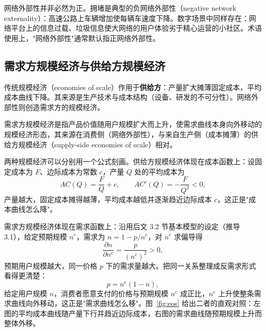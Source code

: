网络外部性并非必然为正。拥堵是典型的负网络外部性（negative network externality）：高速公路上车辆增加使每辆车速度下降。数字场景中同样存在：网络平台上的信息过载、垃圾信息使大网络的用户体验劣于精心运营的小社区。术语使用上，"网络外部性"通常默认指正网络外部性。

\subsection{需求方规模经济与供给方规模经济}

传统规模经济（economies of scale）作用于\textbf{供给方}：产量扩大摊薄固定成本，平均成本曲线下降。其来源是生产技术与成本结构（设备、研发的不可分性）。网络外部性则创造需求方的规模经济。

\begin{definition}
需求方规模经济是指产品价值随用户规模扩大而上升，使需求曲线本身向外移动的规模经济形态，其来源在消费侧（网络外部性），与来自生产侧（成本摊薄）的供给方规模经济（supply-side economies of scale）相对。
\end{definition}

两种规模经济可以分别用一个公式刻画。供给方规模经济体现在成本函数上：设固定成本为 $F$、边际成本为常数 $c$，产量 $Q$ 处的平均成本为
\[
AC(Q) = \frac{F}{Q} + c, \qquad AC'(Q) = -\frac{F}{Q^2} < 0,
\]
产量越大，固定成本摊得越薄，平均成本越低并逐渐趋近边际成本 $c$，这正是"成本曲线怎么降"。

需求方规模经济体现在需求函数上：沿用后文 3.2 节基本模型的设定（推导 3.1），给定预期规模 $n^e$，需求为 $n = 1 - p/n^e$，对 $n^e$ 求偏导得
\[
\frac{\partial n}{\partial n^e} = \frac{p}{(n^e)^2} > 0,
\]
预期用户规模越大，同一价格 $p$ 下的需求量越大。把同一关系整理成反需求形式看得更清楚：
\[
p = n^e (1-n),
\]
给定用户规模 $n$，消费者愿意支付的价格与预期规模 $n^e$ 成正比，$n^e$ 上升使整条需求曲线向外移动，这正是"需求曲线怎么移"。图~\ref{fig:eos} 给出二者的直观对照：左图的平均成本曲线随产量下行并趋近边际成本，右图的需求曲线随预期规模上升而整体外移。

